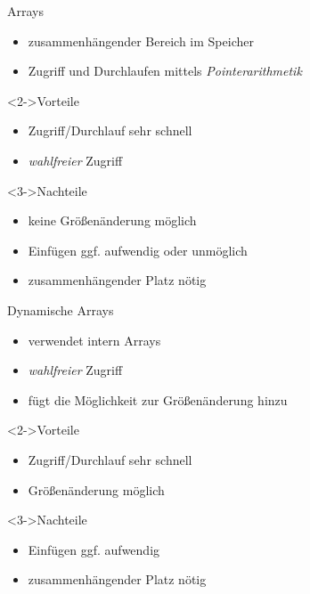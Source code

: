 \begin{frame}
    \begin{block}{Arrays}
        \begin{itemize}
            \item zusammenhängender Bereich im Speicher
            \item Zugriff und Durchlaufen mittels \emph{Pointerarithmetik}
        \end{itemize}
    \end{block}
    \begin{block}<2->{Vorteile}
        \begin{itemize}
            \item Zugriff/Durchlauf sehr schnell
            \item \emph{wahlfreier} Zugriff
        \end{itemize}
    \end{block}
    \begin{block}<3->{Nachteile}
        \begin{itemize}
            \item keine Größenänderung möglich
            \item Einfügen ggf. aufwendig oder unmöglich
            \item zusammenhängender Platz nötig
        \end{itemize}
    \end{block}
\end{frame}

\begin{frame}
    \begin{block}{Dynamische Arrays}
        \begin{itemize}
            \item verwendet intern Arrays
            \item \emph{wahlfreier} Zugriff
            \item fügt die Möglichkeit zur Größenänderung hinzu
        \end{itemize}
    \end{block}
    \begin{block}<2->{Vorteile}
        \begin{itemize}
            \item Zugriff/Durchlauf sehr schnell
            \item Größenänderung möglich
        \end{itemize}
    \end{block}
    \begin{block}<3->{Nachteile}
        \begin{itemize}
            \item Einfügen ggf. aufwendig
            \item zusammenhängender Platz nötig
        \end{itemize}
    \end{block}
\end{frame}

